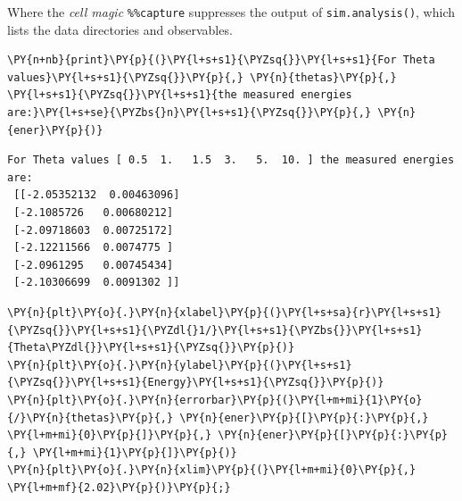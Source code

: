     Where the \emph{cell magic} \texttt{\%\%capture} suppresses the output
of \texttt{sim.analysis()}, which lists the data directories and
observables.

    \begin{tcolorbox}[breakable, size=fbox, boxrule=1pt, pad at break*=1mm,colback=cellbackground, colframe=cellborder]
\begin{Verbatim}[commandchars=\\\{\}]
\PY{n+nb}{print}\PY{p}{(}\PY{l+s+s1}{\PYZsq{}}\PY{l+s+s1}{For Theta values}\PY{l+s+s1}{\PYZsq{}}\PY{p}{,} \PY{n}{thetas}\PY{p}{,} \PY{l+s+s1}{\PYZsq{}}\PY{l+s+s1}{the measured energies are:}\PY{l+s+se}{\PYZbs{}n}\PY{l+s+s1}{\PYZsq{}}\PY{p}{,} \PY{n}{ener}\PY{p}{)}
\end{Verbatim}
\end{tcolorbox}

    \begin{Verbatim}[commandchars=\\\{\}]
For Theta values [ 0.5  1.   1.5  3.   5.  10. ] the measured energies are:
 [[-2.05352132  0.00463096]
 [-2.1085726   0.00680212]
 [-2.09718603  0.00725172]
 [-2.12211566  0.0074775 ]
 [-2.0961295   0.00745434]
 [-2.10306699  0.0091302 ]]
    \end{Verbatim}

    \begin{tcolorbox}[breakable, size=fbox, boxrule=1pt, pad at break*=1mm,colback=cellbackground, colframe=cellborder]
\begin{Verbatim}[commandchars=\\\{\}]
\PY{n}{plt}\PY{o}{.}\PY{n}{xlabel}\PY{p}{(}\PY{l+s+sa}{r}\PY{l+s+s1}{\PYZsq{}}\PY{l+s+s1}{\PYZdl{}1/}\PY{l+s+s1}{\PYZbs{}}\PY{l+s+s1}{Theta\PYZdl{}}\PY{l+s+s1}{\PYZsq{}}\PY{p}{)}
\PY{n}{plt}\PY{o}{.}\PY{n}{ylabel}\PY{p}{(}\PY{l+s+s1}{\PYZsq{}}\PY{l+s+s1}{Energy}\PY{l+s+s1}{\PYZsq{}}\PY{p}{)}
\PY{n}{plt}\PY{o}{.}\PY{n}{errorbar}\PY{p}{(}\PY{l+m+mi}{1}\PY{o}{/}\PY{n}{thetas}\PY{p}{,} \PY{n}{ener}\PY{p}{[}\PY{p}{:}\PY{p}{,} \PY{l+m+mi}{0}\PY{p}{]}\PY{p}{,} \PY{n}{ener}\PY{p}{[}\PY{p}{:}\PY{p}{,} \PY{l+m+mi}{1}\PY{p}{]}\PY{p}{)}
\PY{n}{plt}\PY{o}{.}\PY{n}{xlim}\PY{p}{(}\PY{l+m+mi}{0}\PY{p}{,} \PY{l+m+mf}{2.02}\PY{p}{)}\PY{p}{;}
\end{Verbatim}
\end{tcolorbox}

    \begin{center}
    \end{center}
    { \hspace*{\fill} \\}
    

